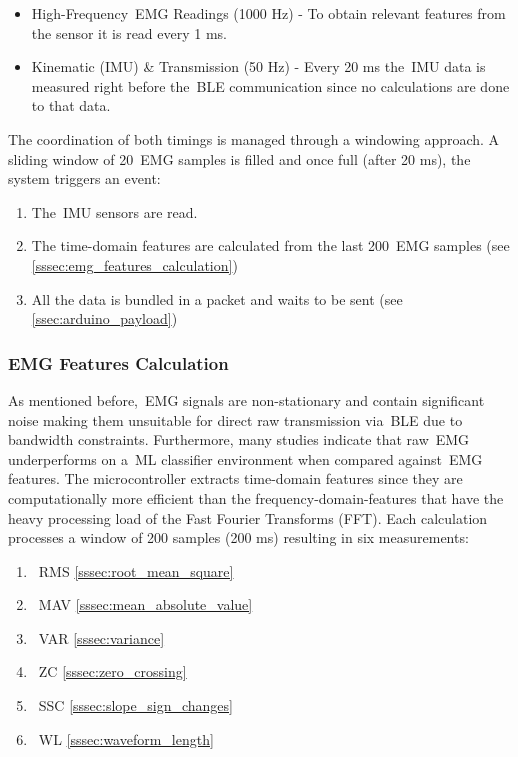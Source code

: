 \begin{itemize}
  \item High-Frequency~\gls{EMG} Readings (1000 Hz) - To obtain relevant features from the sensor it is read every 1 ms.
  \item Kinematic (\gls{IMU}) \& Transmission (50 Hz) - Every 20 ms the~\gls{IMU} data is measured right before the~\gls{BLE} communication since no calculations are done to that data.
\end{itemize}

The coordination of both timings is managed through a windowing approach. A sliding window of 20~\gls{EMG} samples is filled and once full (after 20 ms), the system triggers an event:

\begin{enumerate}
  \item The~\gls{IMU} sensors are read.
  \item The time-domain features are calculated from the last 200~\gls{EMG} samples (see \autoref{sssec:emg_features_calculation})
  \item All the data is bundled in a packet and waits to be sent (see \autoref{ssec:arduino_payload})
\end{enumerate}


\subsubsection{\gls{EMG} Features Calculation}
\label{sssec:emg_features_calculation}

As mentioned before,~\gls{EMG} signals are non-stationary and contain significant noise making them unsuitable for direct raw transmission via~\gls{BLE} due to bandwidth constraints. Furthermore, many studies indicate that raw~\gls{EMG} 
underperforms on a~\gls{ML} classifier environment when compared against~\gls{EMG} features.
The microcontroller extracts time-domain features since they are computationally more efficient than the frequency-domain-features that have the heavy processing load of the Fast Fourier Transforms (FFT).
Each calculation processes a window of 200 samples (200 ms) resulting in six measurements:

\begin{enumerate}
  \item~\gls{RMS} \autoref{sssec:root_mean_square}
  \item~\gls{MAV} \autoref{sssec:mean_absolute_value}
  \item~\gls{VAR} \autoref{sssec:variance}
  \item~\gls{ZC} \autoref{sssec:zero_crossing}
  \item~\gls{SSC} \autoref{sssec:slope_sign_changes}
  \item~\gls{WL} \autoref{sssec:waveform_length}
\end{enumerate}

